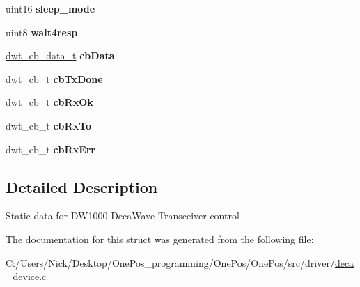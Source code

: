 \begin{DoxyCompactItemize}
\item 
\hypertarget{structdwt__local__data__t_a785f915827677825ce14bd705f7f7c94}{uint16 {\bfseries sleep\-\_\-mode}}\label{structdwt__local__data__t_a785f915827677825ce14bd705f7f7c94}

\item 
\hypertarget{structdwt__local__data__t_ad3064de2878091c1c0802031e5731953}{uint8 {\bfseries wait4resp}}\label{structdwt__local__data__t_ad3064de2878091c1c0802031e5731953}

\item 
\hypertarget{structdwt__local__data__t_a5de0de9d9c90de68b185e4b195e74b92}{\hyperlink{structdwt__cb__data__t}{dwt\-\_\-cb\-\_\-data\-\_\-t} {\bfseries cb\-Data}}\label{structdwt__local__data__t_a5de0de9d9c90de68b185e4b195e74b92}

\item 
\hypertarget{structdwt__local__data__t_a34fe9f5a2aca941ab16f8d23d222fcba}{dwt\-\_\-cb\-\_\-t {\bfseries cb\-Tx\-Done}}\label{structdwt__local__data__t_a34fe9f5a2aca941ab16f8d23d222fcba}

\item 
\hypertarget{structdwt__local__data__t_a0ecb163557d67658450dcf2fccf27c29}{dwt\-\_\-cb\-\_\-t {\bfseries cb\-Rx\-Ok}}\label{structdwt__local__data__t_a0ecb163557d67658450dcf2fccf27c29}

\item 
\hypertarget{structdwt__local__data__t_a1e5f0193de92b0bb8017689d941be665}{dwt\-\_\-cb\-\_\-t {\bfseries cb\-Rx\-To}}\label{structdwt__local__data__t_a1e5f0193de92b0bb8017689d941be665}

\item 
\hypertarget{structdwt__local__data__t_a4ee0e35a934dd0fa730268953a567c19}{dwt\-\_\-cb\-\_\-t {\bfseries cb\-Rx\-Err}}\label{structdwt__local__data__t_a4ee0e35a934dd0fa730268953a567c19}

\end{DoxyCompactItemize}


\subsection{Detailed Description}
Static data for D\-W1000 Deca\-Wave Transceiver control 

The documentation for this struct was generated from the following file\-:\begin{DoxyCompactItemize}
\item 
C\-:/\-Users/\-Nick/\-Desktop/\-One\-Pos\-\_\-programming/\-One\-Pos/\-One\-Pos/src/driver/\hyperlink{deca__device_8c}{deca\-\_\-device.\-c}\end{DoxyCompactItemize}
